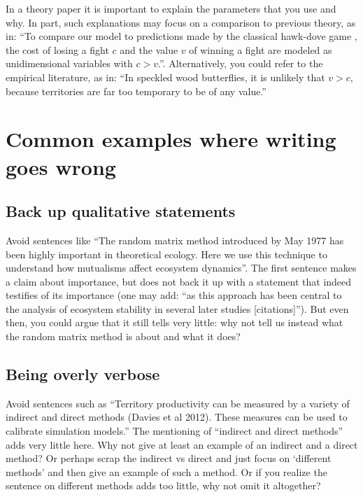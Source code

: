 \documentclass[
]{book}
\begin{document}
In a theory paper it is important to explain the parameters that you use and why. In part, such explanations may focus on a comparison to previous theory, as in: ``To compare our model to predictions made by the classical hawk-dove game \citep{MaynardSmith1973}, the cost of losing a fight \(c\) and the value \(v\) of winning a fight are modeled as unidimensional variables with \(c > v\).''. Alternatively, you could refer to the empirical literature, as in: ``In speckled wood butterflies, it is unlikely that \(v>c\), because territories are far too temporary to be of any value.''

\hypertarget{common-examples-where-writing-goes-wrong}{%
\section{Common examples where writing goes wrong}\label{common-examples-where-writing-goes-wrong}}

\hypertarget{back-up-qualitative-statements}{%
\subsection{Back up qualitative statements}\label{back-up-qualitative-statements}}

Avoid sentences like ``The random matrix method introduced by May 1977 has been highly important in theoretical ecology. Here we use this technique to understand how mutualisms affect ecosystem dynamics''. The first sentence makes a claim about importance, but does not back it up with a statement that indeed testifies of its importance (one may add: ``as this approach has been central to the analysis of ecosystem stability in several later studies {[}citations{]}''). But even then, you could argue that it still tells very little: why not tell us instead what the random matrix method is about and what it does?

\hypertarget{being-overly-verbose}{%
\subsection{Being overly verbose}\label{being-overly-verbose}}

Avoid sentences such as ``Territory productivity can be measured by a variety of
indirect and direct methods (Davies et al 2012). These measures
can be used to calibrate simulation models.'' The mentioning of
``indirect and direct methods'' adds very little here. Why not give at least an
example of an indirect and a direct method? Or perhaps scrap the indirect vs direct and
just focus on `different methods' and then give an example of such a method.
Or if you realize the sentence on different methods adds too little, why not omit it altogether?
\end{document}
